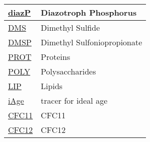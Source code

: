 {\begin{center}
\begin{longtable}{| p{2.0in} | p{4.0in} |}
    \hline
    \hyperref[subsec:var_sec_state_diazP]{diazP} & Diazotroph Phosphorus \\
    \hline
    \hyperref[subsec:var_sec_state_DMS]{DMS} & Dimethyl Sulfide \\
    \hline
    \hyperref[subsec:var_sec_state_DMSP]{DMSP} & Dimethyl Sulfoniopropionate \\
    \hline
    \hyperref[subsec:var_sec_state_PROT]{PROT} & Proteins \\
    \hline
    \hyperref[subsec:var_sec_state_POLY]{POLY} & Polysaccharides \\
    \hline
    \hyperref[subsec:var_sec_state_LIP]{LIP} & Lipids \\
    \hline
    \hyperref[subsec:var_sec_state_iAge]{iAge} & tracer for ideal age \\
    \hline
    \hyperref[subsec:var_sec_state_CFC11]{CFC11} & CFC11 \\
    \hline
    \hyperref[subsec:var_sec_state_CFC12]{CFC12} & CFC12 \\
    \hline
\end{longtable}
\end{center}
}

